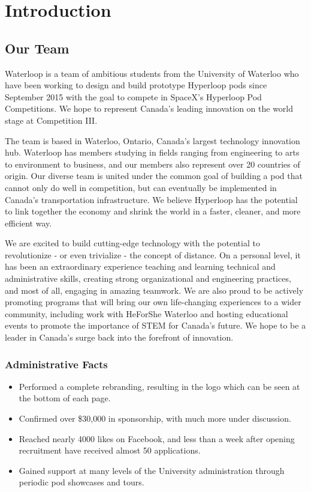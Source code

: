 \documentclass[main.tex]{subfiles}
\begin{document}
\chapter{Introduction}
\label{ch:intro}
\section{Our Team}
Waterloop is a team of ambitious students from the University of Waterloo who have been working to design and build prototype Hyperloop pods since September 2015 with the goal to compete in SpaceX's Hyperloop Pod Competitions. We hope to represent Canada's leading innovation on the world stage at Competition III.

The team is based in Waterloo, Ontario, Canada’s largest technology innovation hub. Waterloop has members studying in fields ranging from engineering to arts to environment to business, and our members also represent over 20 countries of origin. Our diverse team is united under the common goal of building a pod that cannot only do well in competition, but can eventually be implemented in Canada's transportation infrastructure. We believe Hyperloop has the potential to link together the economy and shrink the world in a faster, cleaner, and more efficient way.

We are excited to build cutting-edge technology with the potential to revolutionize - or even trivialize - the concept of distance. On a personal level, it has been an extraordinary experience teaching and learning technical and administrative skills, creating strong organizational and engineering practices, and most of all, engaging in amazing teamwork. We are also proud to be actively promoting programs that will bring our own life-changing experiences to a wider community, including work with HeForShe Waterloo and hosting educational events to promote the importance of STEM for Canada's future. We hope to be a leader in Canada's surge back into the forefront of innovation.

\subsection{Administrative Facts}
\begin{itemize}
\item Performed a complete rebranding, resulting in the logo which can be seen at the bottom of each page.
\item Confirmed over \$30,000 in sponsorship, with much more under discussion.
\item Reached nearly 4000 likes on Facebook, and less than a week after opening recruitment have received almost 50 applications.
\item Gained support at many levels of the University administration through periodic pod showcases and tours.
\end{itemize}
\end{document}
